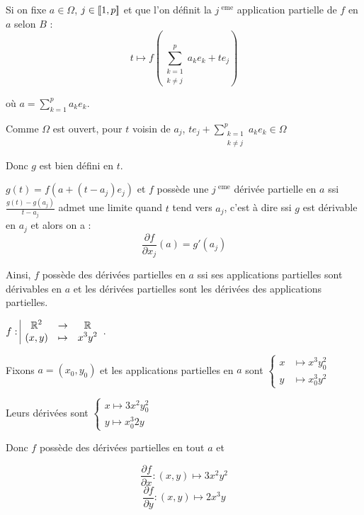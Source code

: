 \begin{remarque}
    Si on fixe $a \in \Omega$, $j \in [\![1, p]\!]$ et que l'on définit la $j^{\text{ eme}}$ 
    application partielle de $f$ en $a$ selon $B$ : 
    $$t \mapsto f\left(\sum_{\substack{k = 1 \\k \neq j}}^p a_ke_k + t e_j \right)$$

    où $a = \displaystyle \sum_{k = 1 }^{p }a_k e_k$. 

    Comme $\Omega$ est ouvert, pour $t$ voisin de $a_j$, $\displaystyle t e_j + \sum_{\substack{k = 1 \\ k \neq j}}^{p } a_k e_k \in \Omega$

    Donc $g$ est bien défini en $t$. 

    $g(t) = f(a + (t - a_j) e_j)$ et $f$ possède une $j^{\text{ eme}}$ dérivée partielle en $a$ 
    ssi $\frac{g(t) - g(a_j)} {t - a_j}$ admet une limite quand $t$ tend vers $a_j$, c'est à dire ssi $g$ est dérivable en $a_j$
    et alors on a :
    $$\frac{\partial f}{\partial x_j}(a) = g'(a_j)$$

    Ainsi, $f$ possède des dérivées partielles en $a$ ssi ses applications partielles sont dérivables
    en $a$ et les dérivées partielles sont les dérivées des applications partielles.
\end{remarque}

\begin{exemple}
    $f: \space \begin{array}{|ccc} \displaystyle \mathbb{R}^2 & \to & \displaystyle \mathbb{R} \\ \displaystyle (x, y) & \mapsto & \displaystyle x^3 y^2 \end{array}$. 

    Fixons $a = (x_0, y_0)$ et les applications partielles en $a$ sont 
    $\begin{cases}
        x & \mapsto x^3 y_0^2 \\
        y & \mapsto x_0^3 y^2
    \end{cases}$

    Leurs dérivées sont $\begin{cases}
        x \mapsto 3 x^2 y_0^2 \\
        y \mapsto x_0^3 2y
    \end{cases}$

    Donc $f$ possède des dérivées partielles en tout $a$ et 

    $$\frac{\partial f}{\partial x} : (x, y) \mapsto 3 x^2 y^2$$
    $$\frac{\partial f } {\partial y } : (x, y) \mapsto 2 x^3 y$$
\end{exemple}

